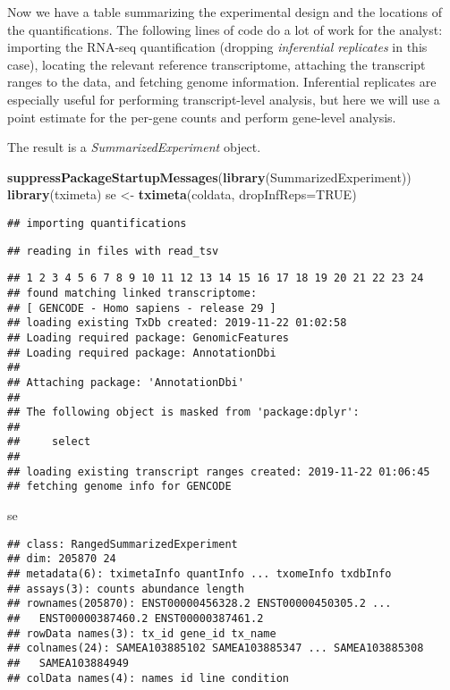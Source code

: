 \documentclass[
]{article}
\newenvironment{Shaded}{}{}
\newcommand{\DataTypeTok}[1]{\textcolor[rgb]{0.56,0.13,0.00}{#1}}
\newcommand{\KeywordTok}[1]{\textcolor[rgb]{0.00,0.44,0.13}{\textbf{#1}}}
\newcommand{\NormalTok}[1]{#1}
\newcommand{\OtherTok}[1]{\textcolor[rgb]{0.00,0.44,0.13}{#1}}
\newcommand{\StringTok}[1]{\textcolor[rgb]{0.25,0.44,0.63}{#1}}
\begin{document}
Now we have a table summarizing the experimental design and the locations of
the quantifications. The following lines of code do a lot of work for the
analyst: importing the RNA-seq quantification (dropping \emph{inferential
replicates} in this case), locating the relevant reference transcriptome,
attaching the transcript ranges to the data, and fetching genome information.
Inferential replicates are especially useful for performing transcript-level
analysis, but here we will use a point estimate for the per-gene counts and
perform gene-level analysis.

The result is a \emph{SummarizedExperiment} object.

\begin{Shaded}
\begin{Highlighting}[]
\KeywordTok{suppressPackageStartupMessages}\NormalTok{(}\KeywordTok{library}\NormalTok{(SummarizedExperiment))}
\KeywordTok{library}\NormalTok{(tximeta)}
\NormalTok{se <-}\StringTok{ }\KeywordTok{tximeta}\NormalTok{(coldata, }\DataTypeTok{dropInfReps=}\OtherTok{TRUE}\NormalTok{)}
\end{Highlighting}
\end{Shaded}

\begin{verbatim}
## importing quantifications
\end{verbatim}

\begin{verbatim}
## reading in files with read_tsv
\end{verbatim}

\begin{verbatim}
## 1 2 3 4 5 6 7 8 9 10 11 12 13 14 15 16 17 18 19 20 21 22 23 24 
## found matching linked transcriptome:
## [ GENCODE - Homo sapiens - release 29 ]
## loading existing TxDb created: 2019-11-22 01:02:58
## Loading required package: GenomicFeatures
## Loading required package: AnnotationDbi
## 
## Attaching package: 'AnnotationDbi'
## 
## The following object is masked from 'package:dplyr':
## 
##     select
## 
## loading existing transcript ranges created: 2019-11-22 01:06:45
## fetching genome info for GENCODE
\end{verbatim}

\begin{Shaded}
\begin{Highlighting}[]
\NormalTok{se}
\end{Highlighting}
\end{Shaded}

\begin{verbatim}
## class: RangedSummarizedExperiment 
## dim: 205870 24 
## metadata(6): tximetaInfo quantInfo ... txomeInfo txdbInfo
## assays(3): counts abundance length
## rownames(205870): ENST00000456328.2 ENST00000450305.2 ...
##   ENST00000387460.2 ENST00000387461.2
## rowData names(3): tx_id gene_id tx_name
## colnames(24): SAMEA103885102 SAMEA103885347 ... SAMEA103885308
##   SAMEA103884949
## colData names(4): names id line condition
\end{verbatim}
\end{document}
